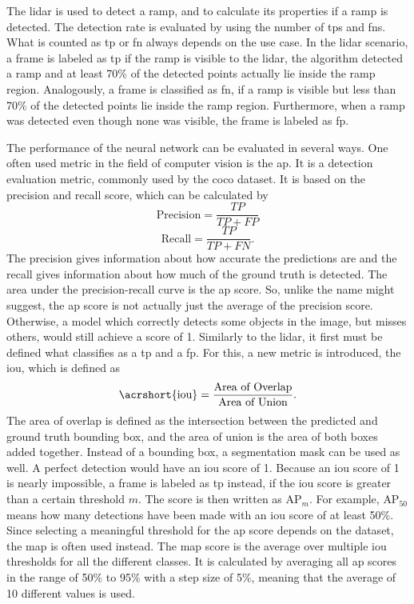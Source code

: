 The \gls{lidar} is used to detect a ramp, and to calculate its properties if a ramp is detected.
The detection rate is evaluated by using the number of \glspl{tp} and \glspl{fn}.
What is counted as \gls{tp} or \gls{fn} always depends on the use case.
In the \gls{lidar} scenario, a frame is labeled as \gls{tp} if the ramp is visible to the \gls{lidar}, the algorithm detected a ramp and at least 70\% of the detected points actually lie inside the ramp region.
Analogously, a frame is classified as \gls{fn}, if a ramp is visible but less than 70\% of the detected points lie inside the ramp region.
Furthermore, when a ramp was detected even though none was visible, the frame is labeled as \gls{fp}.

The performance of the neural network can be evaluated in several ways.
One often used metric in the field of computer vision is the \gls{ap}.
It is a detection evaluation metric, commonly used by the \gls{coco} dataset.
It is based on the precision and recall score, which can be calculated by
\begin{equation}
    \text{Precision} = \frac{TP}{TP+FP}
\end{equation}
\begin{equation}
    \text{Recall} = \frac{TP}{TP+FN}.
\end{equation}
The precision gives information about how accurate the predictions are and the recall gives information about how much of the ground truth is detected.
The area under the precision-recall curve is the \gls{ap} score.
So, unlike the name might suggest, the \gls{ap} score is not actually just the average of the precision score.
Otherwise, a model which correctly detects some objects in the image, but misses others, would still achieve a score of 1.
Similarly to the \gls{lidar}, it first must be defined what classifies as a \gls{tp} and a \gls{fp}.
For this, a new metric is introduced, the \gls{iou}, which is defined as
\begin{equation}
    \text{\acrshort{iou}} = \frac{\text{Area of Overlap}}{\text{Area of Union}}.
\end{equation}
The area of overlap is defined as the intersection between the predicted and ground truth bounding box, and the area of union is the area of both boxes added together.
Instead of a bounding box, a segmentation mask can be used as well.
A perfect detection would have an \gls{iou} score of 1.
Because an \gls{iou} score of 1 is nearly impossible, a frame is labeled as \gls{tp} instead, if the \gls{iou} score is greater than a certain threshold $m$.
The score is then written as $\text{AP}_{m}$.
For example, $\text{AP}_{50}$ means how many detections have been made with an \gls{iou} score of at least 50\%.
Since selecting a meaningful threshold for the \gls{ap} score depends on the dataset, the \gls{map} is often used instead.
The \gls{map} score is the average over multiple \gls{iou} thresholds for all the different classes.
It is calculated by averaging all \gls{ap} scores in the range of 50\% to 95\% with a step size of 5\%, meaning that the average of 10 different values is used.



